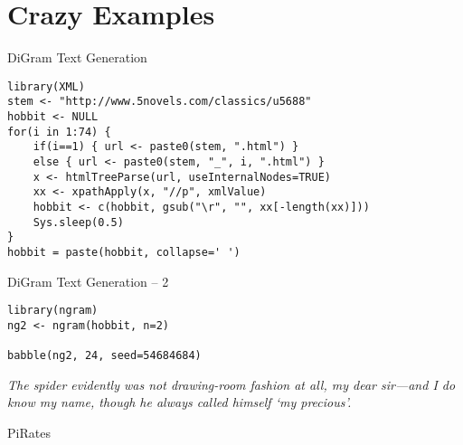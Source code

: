\section{Crazy Examples}\label{crazy-examples}

\begin{frame}[fragile]{DiGram Text Generation}

\begin{verbatim}
library(XML)
stem <- "http://www.5novels.com/classics/u5688"
hobbit <- NULL
for(i in 1:74) {
    if(i==1) { url <- paste0(stem, ".html") } 
    else { url <- paste0(stem, "_", i, ".html") }
    x <- htmlTreeParse(url, useInternalNodes=TRUE)
    xx <- xpathApply(x, "//p", xmlValue)
    hobbit <- c(hobbit, gsub("\r", "", xx[-length(xx)]))
    Sys.sleep(0.5)
}
hobbit = paste(hobbit, collapse=' ')
\end{verbatim}

\end{frame}

\begin{frame}[fragile]{DiGram Text Generation -- 2}

\begin{verbatim}
library(ngram)
ng2 <- ngram(hobbit, n=2)

babble(ng2, 24, seed=54684684)
\end{verbatim}

\emph{The spider evidently was not drawing-room fashion at all, my dear
sir---and I do know my name, though he always called himself `my
precious'.}

\end{frame}

\begin{frame}{PiRates}


\end{frame}
